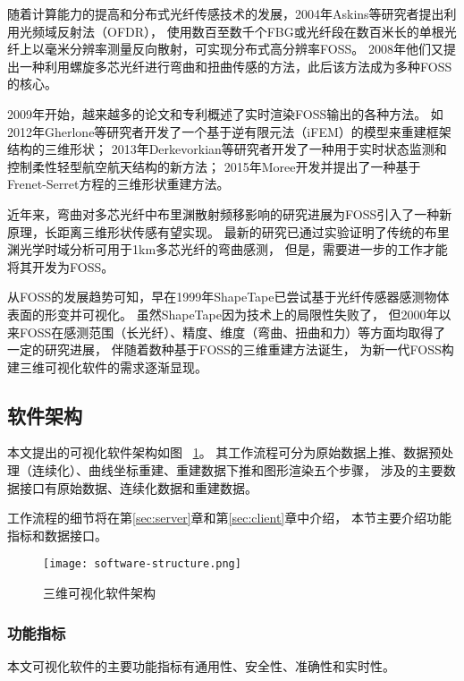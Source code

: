 随着计算能力的提高和分布式光纤传感技术的发展，2004年Askins等研究者提出利用光频域反射法（OFDR），
使用数百至数千个FBG或光纤段在数百米长的单根光纤上以毫米分辨率测量反向散射，可实现分布式高分辨率FOSS\cite{10.1117/12.566653}。
2008年他们又提出一种利用螺旋多芯光纤进行弯曲和扭曲传感的方法，此后该方法成为多种FOSS的核心\cite{4528404}。

2009年开始，越来越多的论文和专利概述了实时渲染FOSS输出的各种方法。
如2012年Gherlone等研究者开发了一个基于逆有限元法（iFEM）的模型来重建框架结构的三维形状\cite{gherlone_shape_2012}；
2013年Derkevorkian等研究者开发了一种用于实时状态监测和控制柔性轻型航空航天结构的新方法\cite{doi:10.2514/1.J052215}；
2015年Moree开发并提出了一种基于Frenet-Serret方程的三维形状重建方法\cite{Moore:15}。

近年来，弯曲对多芯光纤中布里渊散射频移影响的研究进展为FOSS引入了一种新原理，长距离三维形状传感有望实现\cite{10.1364/OE.24.025211,Z10.1364/SENSORS.2016.SeM4D.4}。
最新的研究已通过实验证明了传统的布里渊光学时域分析可用于1km多芯光纤的弯曲感测，
但是，需要进一步的工作才能将其开发为FOSS\cite{10.1364/OE.24.025211}。

从FOSS的发展趋势可知，早在1999年ShapeTape已尝试基于光纤传感器感测物体表面的形变并可视化。
虽然ShapeTape因为技术上的局限性失败了，
但2000年以来FOSS在感测范围（长光纤）、精度、维度（弯曲、扭曲和力）等方面均取得了一定的研究进展，
伴随着数种基于FOSS的三维重建方法诞生，
为新一代FOSS构建三维可视化软件的需求逐渐显现。

\FloatBarrier

\subsection{软件架构}

本文提出的可视化软件架构如图 ~\ref{fig:software}。
其工作流程可分为原始数据上推、数据预处理（连续化）、曲线坐标重建、重建数据下推和图形渲染五个步骤，
涉及的主要数据接口有原始数据、连续化数据和重建数据。

工作流程的细节将在第\ref{sec:server}章和第\ref{sec:client}章中介绍，
本节主要介绍功能指标和数据接口。

\FloatBarrier
\begin{figure}[H]
\centering
\texttt{[image: software-structure.png]}
\caption{三维可视化软件架构}
\label{fig:software} 
\end{figure}

\FloatBarrier

\subsubsection{功能指标}
本文可视化软件的主要功能指标有通用性、安全性、准确性和实时性。

